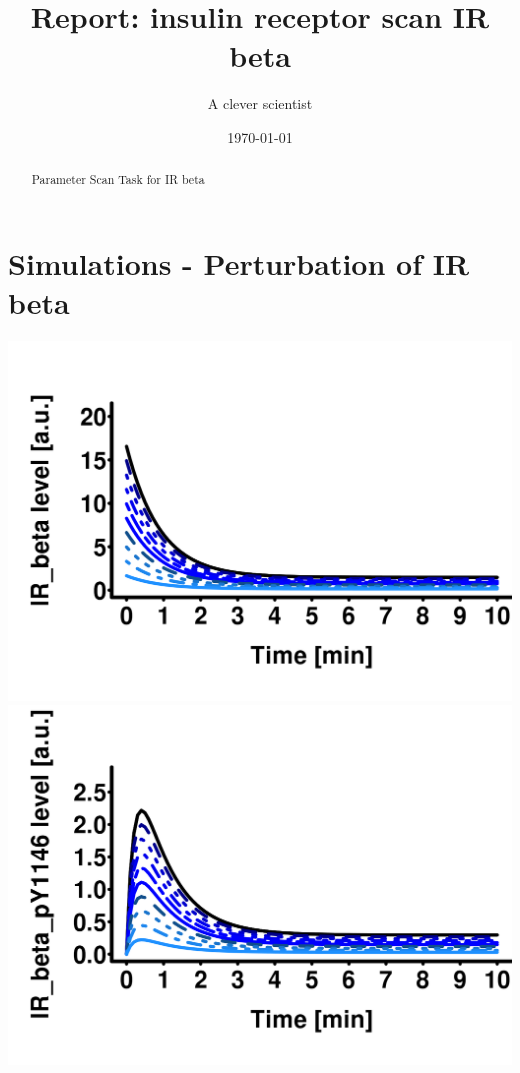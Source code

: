 \documentclass[10pt,a4paper]{article}
\author{A clever scientist}
\title{Report: insulin receptor scan IR beta}
\date{\today}
\begin{document}
\maketitle
\begin{abstract}
Parameter Scan Task for IR beta\end{abstract}
\tableofcontents
\section{Simulations - Perturbation of IR beta}
\includegraphics[scale=0.08]{plots_det_tc_parameter_scan/insulin_receptor_scan_IR_beta__eval_IR_beta__sim_1.png}
\hfill
\includegraphics[scale=0.08]{plots_det_tc_parameter_scan/insulin_receptor_scan_IR_beta__eval_IR_beta_pY1146__sim_1.png}
\hfill
\end{document}
